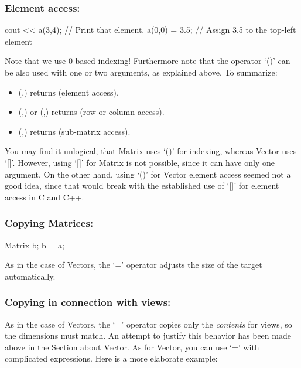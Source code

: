 \subsubsection{Element access:}
\begin{code}
cout << a(3,4); // Print that element.
a(0,0) = 3.5;   // Assign 3.5 to the top-left element
\end{code}

Note that we use 0-based indexing! Furthermore note that the operator
`()' can be also used with one or two  arguments, as
explained above. To summarize:

\begin{itemize}
\item (,) returns  (element access).
\item (,) or (,) returns
   (row or column access).
\item (,) returns 
  (sub-matrix access).
\end{itemize}

You may find it unlogical, that Matrix uses `()' for indexing, whereas
Vector uses `[]'. However, using `[]' for Matrix is not possible,
since it can have only one argument. On the other hand, using `()' for
Vector element access seemed not a good idea, since that would break
with the established use of `[]' for element access in C and C++.

\subsubsection{Copying Matrices:}
\begin{code}
Matrix b;
b = a;
\end{code}

As in the case of Vectors, the `=' operator adjusts the size of the
target automatically.

\subsubsection{Copying in connection with views:}

As in the case of Vectors, the `=' operator copies only the
\emph{contents} for views, so the dimensions must match. An attempt to justify
this behavior has been made above in the Section about Vector. As for
Vector, you can use `=' with complicated expressions. Here is a more
elaborate example:

